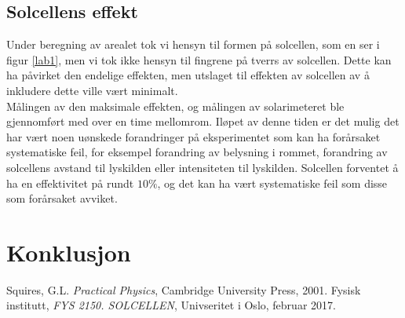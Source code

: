 \documentclass[%
 reprint,
 amsmath,amssymb,
 aps,
 norsk,
 booktabs
]{revtex4-1}
\begin{document}
\subsection{Solcellens effekt}
Under beregning av arealet tok vi hensyn til formen på solcellen, som en ser i figur \vref{lab1}, men vi tok ikke hensyn til fingrene på tverrs av solcellen. Dette kan ha påvirket den endelige effekten, men utslaget til effekten av solcellen av å inkludere dette ville vært minimalt.\\
Målingen av den maksimale effekten, og målingen av solarimeteret ble gjennomført med over en time mellomrom. Iløpet av denne tiden er det mulig det har vært noen uønskede forandringer på eksperimentet som kan ha forårsaket systematiske feil, for eksempel forandring av belysning i rommet, forandring av solcellens avstand til lyskilden eller intensiteten til lyskilden. Solcellen forventet å ha en effektivitet på rundt $10\%$, og det kan ha vært systematiske feil som disse som forårsaket avviket.
\section{Konklusjon}
\begin{thebibliography}{9}
Squires, G.L. \emph{Practical Physics}, Cambridge University Press, 2001.
Fysisk institutt, \emph{FYS 2150. SOLCELLEN}, Univseritet i Oslo, februar 2017.
\end{thebibliography}
\end{document}
